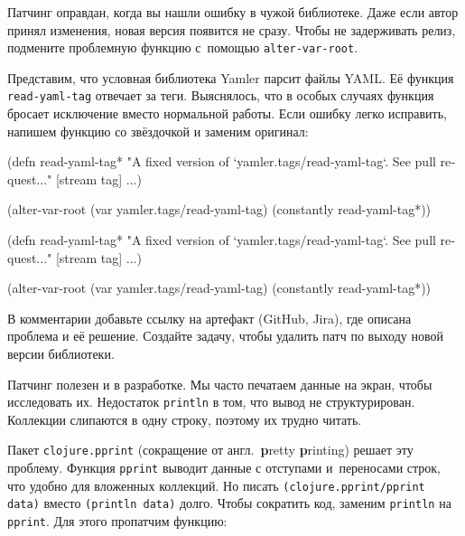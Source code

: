 Патчинг оправдан, когда вы нашли ошибку в чужой библиотеке. Даже если автор
принял изменения, новая версия появится не сразу. Чтобы не задерживать релиз,
подмените проблемную функцию с~помощью \verb|alter-var-root|.

Представим, что условная библиотека Yamler парсит файлы YAML. Её функция
\verb|read-yaml-tag| отвечает за теги. Выяснялось, что в особых случаях функция
бросает исключение вместо нормальной работы. Если ошибку легко исправить,
напишем функцию со звёздочкой и заменим оригинал:

\ifnarrow

\begin{english}
  \begin{clojure}
(defn read-yaml-tag*
  "A fixed version of
   `yamler.tags/read-yaml-tag`.
   See pull request..."
  [stream tag]
  ...)

(alter-var-root
 (var yamler.tags/read-yaml-tag)
 (constantly read-yaml-tag*))
  \end{clojure}
\end{english}

\else

\begin{english}
  \begin{clojure}
(defn read-yaml-tag*
  "A fixed version of `yamler.tags/read-yaml-tag`.
   See pull request..."
  [stream tag]
  ...)

(alter-var-root
 (var yamler.tags/read-yaml-tag)
 (constantly read-yaml-tag*))
  \end{clojure}
\end{english}

\fi

В комментарии добавьте ссылку на артефакт (GitHub, Jira), где описана проблема и
её решение. Создайте задачу, чтобы удалить патч по выходу новой версии
библиотеки.

Патчинг полезен и в разработке. Мы часто печатаем данные на экран, чтобы
исследовать их. Недостаток \verb|println| в том, что вывод не
структурирован. Коллекции слипаются в одну строку, поэтому их трудно читать.


Пакет \verb|clojure.pprint| (сокращение от англ.~\textbf{p}retty \textbf{p}rinting)
решает эту проблему. Функция \verb|pprint| выводит данные с отступами и~переносами строк,
что удобно для вложенных коллекций. Но писать \verb|(clojure.pprint/pprint data)|
вместо \verb|(println data)| долго. Чтобы сократить код, заменим \verb|println|
на \verb|pprint|. Для этого пропатчим функцию:

